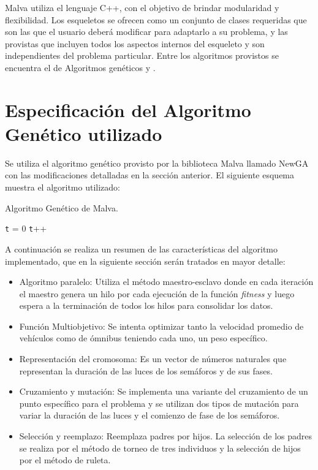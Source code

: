 Malva utiliza el lenguaje C++, con el objetivo de brindar modularidad y flexibilidad. Los esqueletos se ofrecen como un conjunto de clases requeridas que son las que el usuario deberá modificar para adaptarlo a su problema, y las provistas que incluyen todos los aspectos internos del esqueleto y son independientes del problema particular. Entre los algoritmos provistos se encuentra el de Algoritmos genéticos y \citet{CHC}.


\section{Especificación del Algoritmo Genético utilizado}
Se utiliza el algoritmo genético provisto por la biblioteca  Malva llamado NewGA con las modificaciones detalladas en la sección anterior. El siguiente esquema muestra el algoritmo utilizado:

\begin{algorithm}[H]
	\caption{Algoritmo Genético de Malva. }
	\label{alg:algoritmo_genetico_malva}
	\begin{algorithmic} [1] 
		{
			\STATE \texttt{t} = 0
			\STATE \texttt{t}++		
			\ENDWHILE
		}
	\end{algorithmic}
	
\end{algorithm}

A continuación se realiza un resumen de las características del algoritmo implementado, que en la siguiente sección serán tratados en mayor detalle:
\begin{itemize}

\item Algoritmo paralelo: Utiliza el método maestro-esclavo donde en cada iteración el maestro genera un hilo por cada ejecución  de la función \emph{fitness} y luego espera a la terminación de todos los hilos para consolidar los datos. 
\item Función Multiobjetivo: Se intenta optimizar tanto la velocidad promedio de vehículos como de ómnibus teniendo cada uno, un peso específico.
\item Representación del cromosoma: Es un vector de números naturales que representan la duración de las luces de los semáforos y de sus fases.
\item Cruzamiento y mutación: Se implementa una variante del cruzamiento de un punto específico para el problema y se utilizan dos tipos de mutación para variar la duración de las luces y el comienzo de fase de los semáforos.
\item Selección y reemplazo: Reemplaza padres por hijos. La selección de los padres se realiza por el método de torneo de tres individuos y la selección de hijos por el método de ruleta.

\end{itemize}

